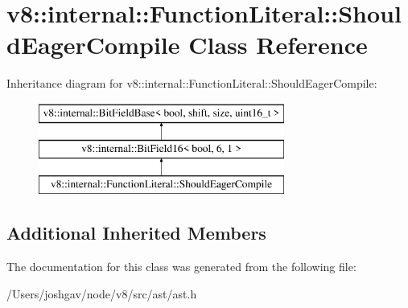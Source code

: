 \hypertarget{classv8_1_1internal_1_1_function_literal_1_1_should_eager_compile}{}\section{v8\+:\+:internal\+:\+:Function\+Literal\+:\+:Should\+Eager\+Compile Class Reference}
\label{classv8_1_1internal_1_1_function_literal_1_1_should_eager_compile}
Inheritance diagram for v8\+:\+:internal\+:\+:Function\+Literal\+:\+:Should\+Eager\+Compile\+:\begin{figure}[H]
\begin{center}
\leavevmode
\includegraphics[height=3.000000cm]{classv8_1_1internal_1_1_function_literal_1_1_should_eager_compile}
\end{center}
\end{figure}
\subsection*{Additional Inherited Members}


The documentation for this class was generated from the following file\+:\begin{DoxyCompactItemize}
\item 
/\+Users/joshgav/node/v8/src/ast/ast.\+h\end{DoxyCompactItemize}
